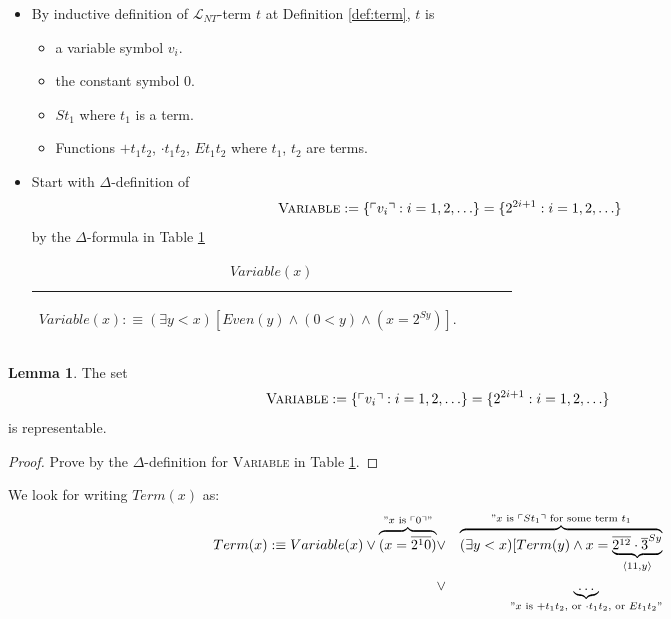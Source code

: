 \documentclass[11pt,letterpaper]{book}
\theoremstyle{definition}
\newtheorem{lemma}{Lemma}[section]
\begin{document}
\begin{itemize}
{\begin{table}[h]
\end{table}

}
\item{By inductive definition of $\mathcal{L}_{NT}$-term $t$ at Definition \ref{def:term}, $t$ is}
\begin{itemize}
\item{a variable symbol $v_i$.}
\item{the constant symbol $0$.}
\item{$S t_1$ where $t_1$ is a term.}
\item{Functions $+ t_1 t_2$, $\cdot t_1 t_2$, $E t_1 t_2$ where $t_1$, $t_2$ are terms.}
\end{itemize}
\item{Start with $\Delta$-definition of 
$$ \text{\textsc{Variable}} : = \{ \ulcorner v_i \urcorner : i = 1, 2, \ldots \} = \{ 2^{2i +1} : i = 1, 2, \ldots \} $$
by the $\Delta$-formula in Table \ref{box:variable}

\begin{table}[h]
\caption{$Variable(x)$}
\label{box:variable}
\begin{tabular}{|p{0.9\linewidth}|}
\hline
\rule{0pt}{3ex}
\begin{center}
$Variable(x) : \equiv (\exists y < x) [ Even(y) \land (0 < y) \land (x = 2^{Sy} ) ]. $
\end{center}\\
\hline
\end{tabular}
\end{table}

}
\end{itemize}



\begin{lemma}\label{lemma:representable_variable_set}
The set
$$ \text{\textsc{Variable}} : = \{ \ulcorner v_i \urcorner : i = 1, 2, \ldots \} = \{ 2^{2i +1} : i = 1, 2, \ldots \} $$
is representable.
\end{lemma}

\begin{proof}
Prove by the $\Delta$-definition for \textsc{Variable} in Table \ref{box:variable}.
\end{proof}

We look for writing $Term(x)$ as:
\begin{eqnarray*}
Term(x) :\equiv Variable(x) \lor \overbrace{(x = \overline{2^10})}^{ " x \text{ is } \ulcorner 0 \urcorner " } &\lor & \overbrace{(\exists y < x) [ Term(y) \land x = \underbrace{\overline{2^{12}} \cdot \overline{3}^{S y}}_{\langle 11, y \rangle}}^{" x \text{ is } \ulcorner S t_1 \urcorner \text{ for some term } t_1 } \\
&\lor & \underbrace{\ldots}_{ " x \text{ is } + t_1 t_2, \text{ or } \cdot t_1 t_2, \text{ or } E t_1 t_2" }
\end{eqnarray*}
\end{document}
